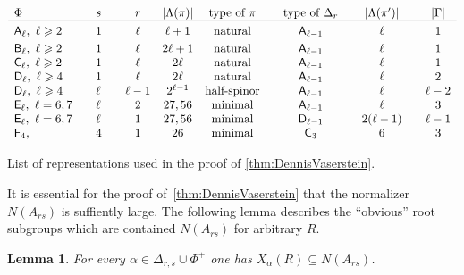 \documentclass[11pt]{amsart}
\theoremstyle{plain}
\numberwithin{equation}{section}
\newtheorem{lemma}{Lemma}
\numberwithin{lemma}{section}
\theoremstyle{definition}
\theoremstyle{remark}
\newcommand{\rA}{\mathsf{A}}
\newcommand{\rB}{\mathsf{B}}
\newcommand{\rC}{\mathsf{C}}
\newcommand{\rD}{\mathsf{D}}
\newcommand{\rE}{\mathsf{E}}
\newcommand{\rF}{\mathsf{F}}
\begin{document}
\begin{table}[htb]
\[\begin{array}{l @{\qquad} l @{\qquad} c @{\quad} c @{\quad} c @{\qquad} c @{\qquad} c @{\qquad} c}
\Phi                                  & s    &r      & |\Lambda(\pi)| & \text{type of $\pi$} & \text{type of $\Delta_r$} & |\Lambda(\pi')|& |\Gamma|  \\ \hline\vphantom{\Bigl(}
\rA_\ell, \ \ell\geqslant 2           & 1    &\ell   & \ell+1         & \text{natural}       & \rA_{\ell-1}              & \ell           & 1  \\     
\rB_\ell, \ \ell\geqslant 2           & 1    &\ell   & 2\ell+1        & \text{natural}       & \rA_{\ell-1}              & \ell           & 1  \\     
\rC_\ell, \ \ell\geqslant 2           & 1    &\ell   & 2\ell          & \text{natural}       & \rA_{\ell-1}              & \ell           & 1  \\
\rD_\ell, \ \ell\geqslant 4           & 1    &\ell   & 2\ell          & \text{natural}       & \rA_{\ell-1}              & \ell           & 2  \\ 
\rD_\ell, \ \ell\geqslant 4           & \ell &\ell-1 & 2^{\ell-1}     & \text{half-spinor}   & \rA_{\ell-1}              & \ell           & \ell-2  \\
\rE_\ell, \ \ell=6, 7                 & \ell &2      & 27, 56         & \text{minimal}       & \rA_{\ell-1}              & \ell           & 3       \\ 
\rE_\ell, \ \ell=6, 7                 & \ell &1      & 27, 56         & \text{minimal}       & \rD_{\ell-1}              & 2(\ell-1)      & \ell-1 \\
\rF_4,                                & 4    & 1     & 26             & \text{minimal}       & \rC_{3}                   & 6              & 3 \end{array}\]
 \caption{List of representations used in the proof of \cref{thm:DennisVaserstein}.} \label{table:dv-reps}
\end{table}
It is essential for the proof of~\cref{thm:DennisVaserstein} that the normalizer $N(A_{rs})$ is suffiently large.
The following lemma describes the ``obvious'' root subgroups which are contained $N(A_{rs})$ for arbitrary $R$.
\begin{lemma}\label{lemma:dv-normal} 
For every $\alpha \in \Delta_{r, s} \cup \Phi^+ $ one has $X_\alpha(R) \subseteq N(A_{rs})$. \end{lemma}
\end{document}
